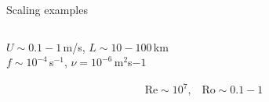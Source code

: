 \documentclass[aspectratio=169,xcolor=dvipsnames]{beamer}
\begin{document}
\begin{frame}[t]{Scaling examples}
\begin{columns}
\begin{column}[t]{0.5\textwidth}
        \vspace{1.0em}

         \begin{small}
        $U\sim0.1-1$\,m/s, \hspace{10pt}
        $L\sim10-100$\,km \\
        $f\sim10^{-4}$\,s$^{-1}$, \hspace{10pt} 
        $\nu = 10^{-6}$\,m$^2$s${-1}$\\
        \end{small}

        {\boldmath
        \begin{align*}
            \text{Re}\sim10^{7}, \hspace{10pt}
            \text{Ro}\sim0.1-1 \\
        \end{align*}
        }
        
    \end{column}
    
\end{columns}

\end{frame}
\end{document}
